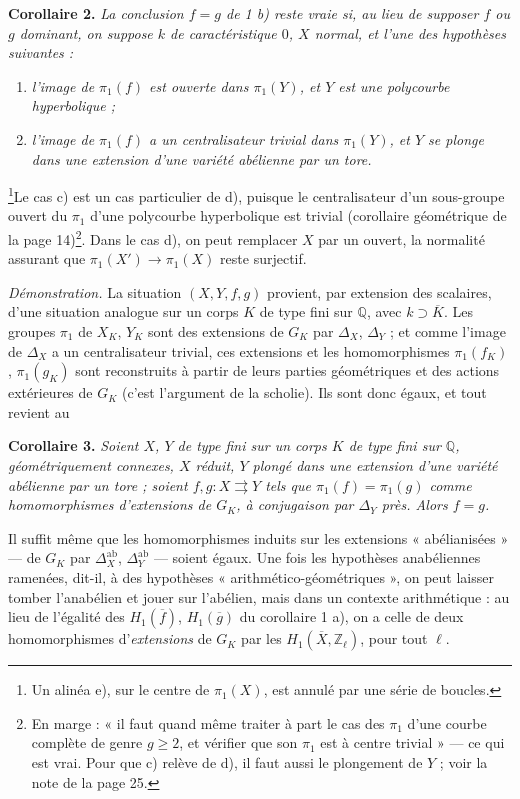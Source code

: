 \documentclass[11pt,a4paper]{article}
\begin{document}
\textbf{Corollaire 2.} \emph{La conclusion $f = g$ de 1 b) reste vraie si,
au lieu de supposer $f$ ou $g$ dominant, on suppose $k$ de caractéristique
$0$, $X$ normal, et l'une des hypothèses suivantes :}
\begin{enumerate}
\item[c)] \emph{l'image de $\pi_1(f)$ est ouverte dans $\pi_1(Y)$, et $Y$ est
une polycourbe hyperbolique ;}
\item[d)] \emph{l'image de $\pi_1(f)$ a un centralisateur trivial dans
$\pi_1(Y)$, et $Y$ se plonge dans une extension d'une variété abélienne par
un tore.}
\end{enumerate}
\footnote{Un alinéa e), sur le centre de $\pi_1(X)$, est annulé par une série
de boucles.}Le cas c) est un cas particulier de d), puisque le centralisateur
d'un sous-groupe ouvert du $\pi_1$ d'une polycourbe hyperbolique est trivial
(corollaire géométrique de la page 14)\footnote{En marge : « il faut quand
même traiter à part le cas des $\pi_1$ d'une courbe complète de genre
$g \ge 2$, et vérifier que son $\pi_1$ est à centre trivial » — ce qui est
vrai. Pour que c) relève de d), il faut aussi le plongement de $Y$ ; voir la
note de la page 25.}. Dans le cas d), on peut remplacer $X$ par un ouvert,
la normalité assurant que $\pi_1(X') \to \pi_1(X)$ reste surjectif.

\emph{Démonstration.} La situation $(X, Y, f, g)$ provient, par extension des
scalaires, d'une situation analogue sur un corps $K$ de type fini sur
$\mathbb{Q}$, avec $k \supset \overline{K}$. Les groupes $\pi_1$ de $X_K$,
$Y_K$ sont des extensions de $G_K$ par $\Delta_X$, $\Delta_Y$ ; et comme
l'image de $\Delta_X$ a un centralisateur trivial, ces extensions et les
homomorphismes $\pi_1(f_K)$, $\pi_1(g_K)$ sont reconstruits à partir de leurs
parties géométriques et des actions extérieures de $G_K$ (c'est l'argument de
la scholie). Ils sont donc égaux, et tout revient au

\textbf{Corollaire 3.} \emph{Soient $X$, $Y$ de type fini sur un corps $K$
de type fini sur $\mathbb{Q}$, géométriquement connexes, $X$ réduit, $Y$
plongé dans une extension d'une variété abélienne par un tore ; soient $f,
g : X \rightrightarrows Y$ tels que $\pi_1(f) = \pi_1(g)$ comme homomorphismes
d'extensions de $G_K$, à conjugaison par $\Delta_Y$ près. Alors $f = g$.}

Il suffit même que les homomorphismes induits sur les extensions
« abélianisées » — de $G_K$ par $\Delta_X^{\mathrm{ab}}$, $\Delta_Y^{\mathrm{ab}}$
— soient égaux. Une fois les hypothèses anabéliennes ramenées, dit-il, à des
hypothèses « arithmético-géométriques », on peut laisser tomber l'anabélien et
jouer sur l'abélien, mais dans un contexte arithmétique : au lieu de
l'égalité des $H_1(\overline{f})$, $H_1(\overline{g})$ du corollaire 1 a), on a
celle de deux homomorphismes d'\emph{extensions} de $G_K$ par les
$H_1(\overline{X}, \mathbb{Z}_\ell)$, pour tout $\ell$.
\end{document}
